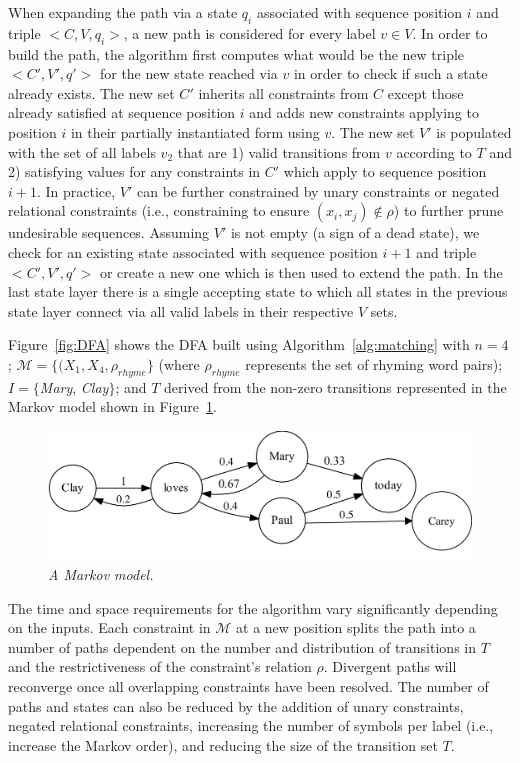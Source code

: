 \documentclass[phd,electronic,oneside,twosidetoc,letterpaper,chaptercenter,parttop,lol,lof,lot]{byumsphd}
\begin{document}
When expanding the path via a state $q_i$ associated with sequence position $i$ and triple $<C,V,q_i>$, a new path is considered for every label $v\in V$. In order to build the path, the algorithm first computes what would be the new triple $<C',V',q'>$ for the new state reached via $v$ in order to check if such a state already exists. The new set $C'$ inherits all constraints from $C$ except those already satisfied at sequence position $i$ and adds new constraints applying to position $i$ in their partially instantiated form using $v$. The new set $V'$ is populated with the set of all labels $v_2$ that are 1) valid transitions from $v$ according to $T$ and 2) satisfying values for any constraints in $C'$ which apply to sequence position $i+1$. In practice, $V'$ can be further constrained by unary constraints or negated relational constraints (i.e., constraining to ensure $(x_i,x_j)\not\in\rho$) to further prune undesirable sequences. Assuming $V'$ is not empty (a sign of a dead state), we check for an existing state associated with sequence position $i+1$ and triple $<C',V',q'>$ or create a new one which is then used to extend the path. In the last state layer there is a single accepting state to which all states in the previous state layer connect via all valid labels in their respective $V$ sets. 

Figure~\ref{fig:DFA} shows the DFA built using Algorithm~\ref{alg:matching} with $n=4$; $\mathcal{M}=\{(X_1,X_4,\rho_{rhyme}\}$ (where $\rho_{rhyme}$ represents the set of rhyming word pairs); $I=\{$\textit{Mary}, \textit{Clay}$\}$; and $T$ derived from the non-zero transitions represented in the Markov model shown in Figure~\ref{fig:markov}.

\begin{figure}
\centering
\includegraphics[width=\linewidth]{markov}
\caption{\textit{A Markov model.}}
\label{fig:markov}
\end{figure}

The time and space requirements for the algorithm vary significantly depending on the inputs. Each constraint in $\mathcal{M}$ at a new position splits the path into a number of paths dependent on the number and distribution of transitions in $T$ and the restrictiveness of the constraint's relation $\rho$. Divergent paths will reconverge once all overlapping constraints have been resolved. The number of paths and states can also be reduced by the addition of unary constraints, negated relational constraints, increasing the number of symbols per label (i.e., increase the Markov order), and reducing the size of the transition set $T$.
\end{document}
